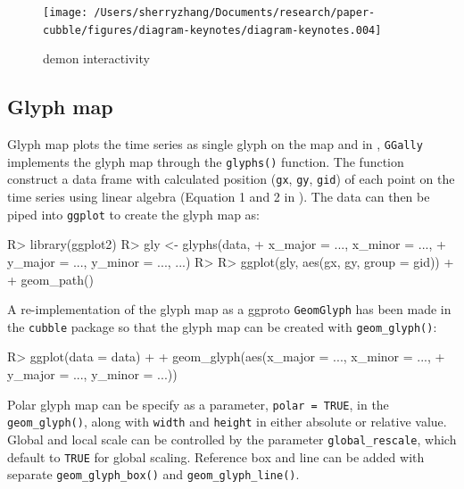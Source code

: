 \documentclass[
]{jss}
\begin{document}
\begin{CodeChunk}
\begin{figure}

{\centering \texttt{[image: /Users/sherryzhang/Documents/research/paper-cubble/figures/diagram-keynotes/diagram-keynotes.004]} 

}

\caption[demon interactivity]{demon interactivity}\label{fig:illu-interactive}
\end{figure}
\end{CodeChunk}

\hypertarget{glyph-map}{%
\subsection{Glyph map}\label{glyph-map}}

Glyph map \citep{Wickham2012-yr} plots the time series as single glyph
on the map and in , \texttt{GGally} implements the glyph map
through the \texttt{glyphs()} function. The function construct a data
frame with calculated position (\texttt{gx}, \texttt{gy}, \texttt{gid})
of each point on the time series using linear algebra (Equation 1 and 2
in \citet{Wickham2012-yr}). The data can then be piped into
\texttt{ggplot} to create the glyph map as:

\begin{CodeChunk}
\begin{CodeInput}
R> library(ggplot2)
R> gly <- glyphs(data, 
+               x_major = ..., x_minor = ..., 
+               y_major = ..., y_minor = ..., ...)
R> 
R> ggplot(gly, aes(gx, gy, group = gid)) + 
+   geom_path() 
\end{CodeInput}
\end{CodeChunk}

A re-implementation of the glyph map as a ggproto \texttt{GeomGlyph} has
been made in the \texttt{cubble} package so that the glyph map can be
created with \texttt{geom\_glyph()}:

\begin{CodeChunk}
\begin{CodeInput}
R> ggplot(data = data) +
+   geom_glyph(aes(x_major = ..., x_minor = ..., 
+                  y_major = ..., y_minor = ...))
\end{CodeInput}
\end{CodeChunk}

Polar glyph map can be specify as a parameter, \texttt{polar\ =\ TRUE},
in the \texttt{geom\_glyph()}, along with \texttt{width} and
\texttt{height} in either absolute or relative value. Global and local
scale can be controlled by the parameter \texttt{global\_rescale}, which
default to \texttt{TRUE} for global scaling. Reference box and line can
be added with separate \texttt{geom\_glyph\_box()} and
\texttt{geom\_glyph\_line()}.
\end{document}
